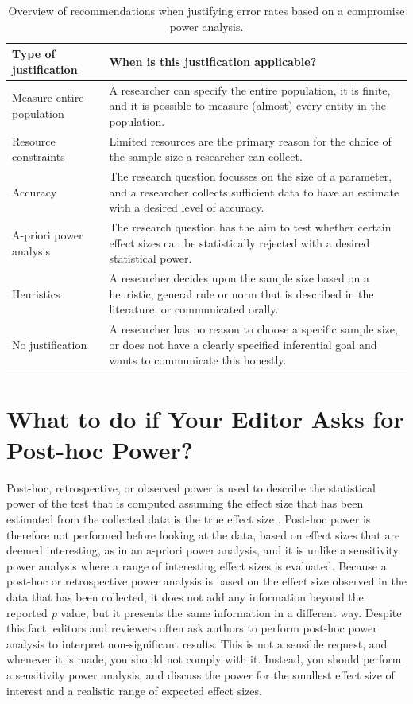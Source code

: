 \documentclass[
]{krantz}
\begin{document}
\begin{table}

\caption{\label{tab:table-compromise-just}Overview of recommendations when justifying error rates based on a compromise power analysis.}
\centering
\begin{tabular}[t]{l|l}
\hline
Type of justification & When is this justification applicable?\\
\hline
Measure entire population & A researcher can specify the entire population, it is finite, and it is possible to measure (almost) every entity in the population.\\
\hline
Resource constraints & Limited resources are the primary reason for the choice of the sample size a researcher can collect.\\
\hline
Accuracy & The research question focusses on the size of a parameter, and a researcher collects sufficient data to have an estimate with a desired level of accuracy.\\
\hline
A-priori power analysis & The research question has the aim to test whether certain effect sizes can be statistically rejected with a desired statistical power.\\
\hline
Heuristics & A researcher decides upon the sample size based on a heuristic, general rule or norm that is described in the literature, or communicated orally.\\
\hline
No justification & A researcher has no reason to choose a specific sample size, or does not have a clearly specified inferential goal and wants to communicate this honestly.\\
\hline
\end{tabular}
\end{table}

\hypertarget{what-to-do-if-your-editor-asks-for-post-hoc-power}{%
\section{What to do if Your Editor Asks for Post-hoc Power?}\label{what-to-do-if-your-editor-asks-for-post-hoc-power}}

Post-hoc, retrospective, or observed power is used to describe the statistical power of the test that is computed assuming the effect size that has been estimated from the collected data is the true effect size \citep{zumbo_note_1998, lenth_post_2007}. Post-hoc power is therefore not performed before looking at the data, based on effect sizes that are deemed interesting, as in an a-priori power analysis, and it is unlike a sensitivity power analysis where a range of interesting effect sizes is evaluated. Because a post-hoc or retrospective power analysis is based on the effect size observed in the data that has been collected, it does not add any information beyond the reported \emph{p} value, but it presents the same information in a different way. Despite this fact, editors and reviewers often ask authors to perform post-hoc power analysis to interpret non-significant results. This is not a sensible request, and whenever it is made, you should not comply with it. Instead, you should perform a sensitivity power analysis, and discuss the power for the smallest effect size of interest and a realistic range of expected effect sizes.
\end{document}

